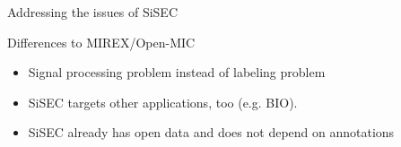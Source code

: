\documentclass{beamer}
\begin{document}






\begin{frame}{Addressing the issues of SiSEC}

Differences to MIREX/Open-MIC

\begin{itemize}
	\item Signal processing problem instead of labeling problem
	\item SiSEC targets other applications, too (e.g. BIO).
    \item SiSEC already has open data and does not depend on annotations
\end{itemize}
\end{frame}
\end{document}
